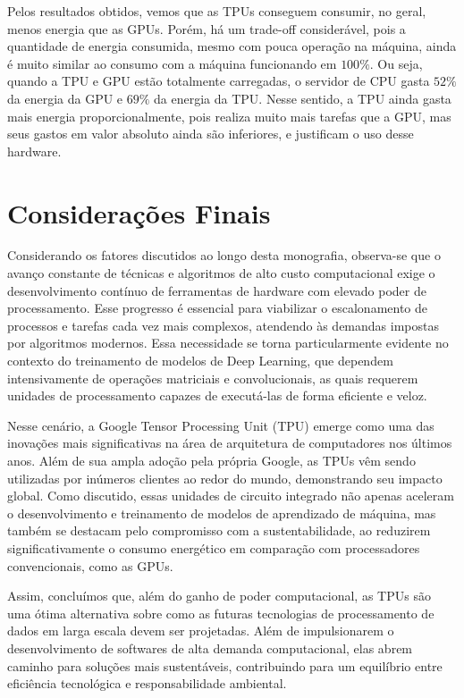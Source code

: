 \documentclass{report}
\begin{document}
Pelos resultados obtidos, vemos que as TPUs conseguem consumir, no geral, menos energia que as GPUs. Porém, há um trade-off considerável, pois a quantidade de energia consumida, mesmo com pouca operação na máquina, ainda é muito similar ao consumo com a máquina funcionando em $100\%$. Ou seja, quando a TPU e GPU estão totalmente carregadas, o servidor de CPU gasta $52\%$ da energia da GPU e $69\%$ da energia da TPU. Nesse sentido, a TPU ainda gasta mais energia proporcionalmente, pois realiza muito mais tarefas que a GPU, mas seus gastos em valor absoluto ainda são inferiores, e justificam o uso desse hardware.

\chapter{Considerações Finais}

\setlength{\parskip}{1em}\hspace{0.5cm} Considerando os fatores discutidos ao longo desta monografia, observa-se que o avanço constante de técnicas e algoritmos de alto custo computacional exige o desenvolvimento contínuo de ferramentas de hardware com elevado poder de processamento. Esse progresso é essencial para viabilizar o escalonamento de processos e tarefas cada vez mais complexos, atendendo às demandas impostas por algoritmos modernos. Essa necessidade se torna particularmente evidente no contexto do treinamento de modelos de Deep Learning, que dependem intensivamente de operações matriciais e convolucionais, as quais requerem unidades de processamento capazes de executá-las de forma eficiente e veloz.

Nesse cenário, a Google Tensor Processing Unit (TPU) emerge como uma das inovações mais significativas na área de arquitetura de computadores nos últimos anos. Além de sua ampla adoção pela própria Google, as TPUs vêm sendo utilizadas por inúmeros clientes ao redor do mundo, demonstrando seu impacto global. Como discutido, essas unidades de circuito integrado não apenas aceleram o desenvolvimento e treinamento de modelos de aprendizado de máquina, mas também se destacam pelo compromisso com a sustentabilidade, ao reduzirem significativamente o consumo energético em comparação com processadores convencionais, como as GPUs.

Assim, concluímos que, além do ganho de poder computacional, as TPUs são uma ótima alternativa sobre como as futuras tecnologias de processamento de dados em larga escala devem ser projetadas. Além de impulsionarem o desenvolvimento de softwares de alta demanda computacional, elas abrem caminho para soluções mais sustentáveis, contribuindo para um equilíbrio entre eficiência tecnológica e responsabilidade ambiental.
\end{document}
